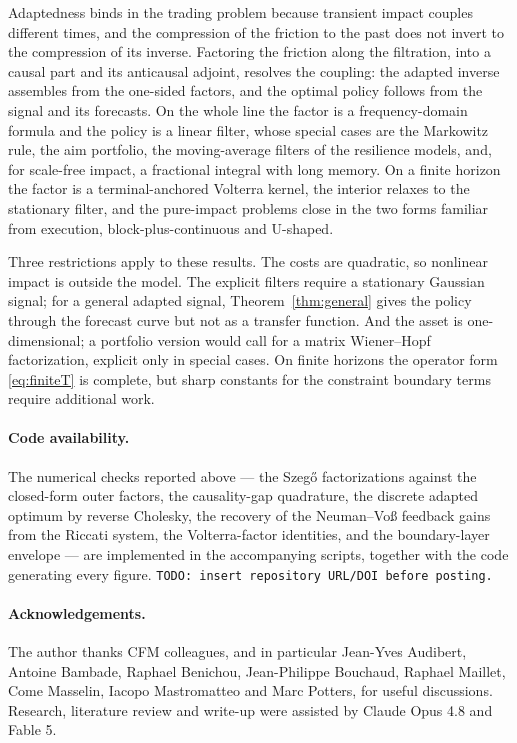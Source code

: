 \documentclass[11pt]{article}
\theoremstyle{plain}
\theoremstyle{definition}
\theoremstyle{remark}
\begin{document}
Adaptedness binds in the trading problem because transient impact couples different times, and the compression of the friction to the past does not invert to the compression of its inverse. Factoring the friction along the filtration, into a causal part and its anticausal adjoint, resolves the coupling: the adapted inverse assembles from the one-sided factors, and the optimal policy follows from the signal and its forecasts. On the whole line the factor is a frequency-domain formula and the policy is a linear filter, whose special cases are the Markowitz rule, the aim portfolio, the moving-average filters of the resilience models, and, for scale-free impact, a fractional integral with long memory. On a finite horizon the factor is a terminal-anchored Volterra kernel, the interior relaxes to the stationary filter, and the pure-impact problems close in the two forms familiar from execution, block-plus-continuous and U-shaped.

Three restrictions apply to these results. The costs are quadratic, so nonlinear impact is outside the model. The explicit filters require a stationary Gaussian signal; for a general adapted signal, Theorem~\ref{thm:general} gives the policy through the forecast curve but not as a transfer function. And the asset is one-dimensional; a portfolio version would call for a matrix Wiener--Hopf factorization, explicit only in special cases. On finite horizons the operator form \eqref{eq:finiteT} is complete, but sharp constants for the constraint boundary terms require additional work.

\paragraph{Code availability.} The numerical checks reported above --- the Szeg\H{o} factorizations against the closed-form outer factors, the causality-gap quadrature, the discrete adapted optimum by reverse Cholesky, the recovery of the Neuman--Vo\ss{} feedback gains from the Riccati system, the Volterra-factor identities, and the boundary-layer envelope --- are implemented in the accompanying scripts, together with the code generating every figure. \texttt{TODO: insert repository URL/DOI before posting.}

\paragraph{Acknowledgements.} The author thanks CFM colleagues, and in particular Jean-Yves Audibert, Antoine Bambade, Raphael Benichou, Jean-Philippe Bouchaud, Raphael Maillet, Come Masselin, Iacopo Mastromatteo and Marc Potters, for useful discussions. Research, literature review and write-up were assisted by Claude Opus 4.8 and Fable 5.
\end{document}
